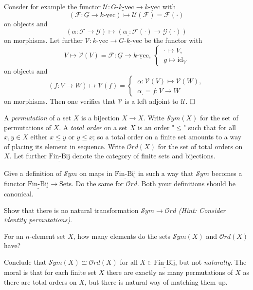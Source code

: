 \documentclass[11pt]{book}
\numberwithin{dummy}{section}
\theoremstyle{nonumberbreak}
\newenvironment{sol}[1][]{\ifthenelse{\equal{#1}{}}{\solution}{\solution[#1]}\rm}{\endsolution}
\newenvironment{prob}[1][]{\ifthenelse{\equal{#1}{}}{\problem}{\problem[#1]}\rm}{\endproblem}
\newcommand{\sets}{\underline{\mathrm{Sets}}}
\newcommand{\kvec}{\underline{k\textrm{-}\mathrm{vec}}}
\newcommand{\finbij}{\underline{\mathrm{Fin}\textrm{-}\mathrm{Bij}}}
\newcommand{\gkvec}{\underline{G\textrm{-}k\textrm{-}\mathrm{vec}}}
\newcommand{\F}{\mathcal{F}}
\newcommand{\G}{\mathcal{G}}
\newcommand{\la}{\longrightarrow}
\newcommand{\id}{\mathrm{id}}
\begin{document}
\begin{spacing}{1.4}
\begin{prob}
\begin{sol}
\begin{compactenum}
\item Consder for example the functor $\mathcal{U}: \gkvec \la \kvec$ with 
$$(\F: \underline{G} \la \kvec) \mapsto \mathcal{U}(\F) = \F(\cdot)$$
on objects and 
$$(\alpha: \F \la \G) \mapsto \left( \alpha_.: \F(\cdot) \la \G(\cdot)\right)$$
on morphisms. Let further $\mathcal{V}: \kvec \la \gkvec$ be the functor with 
$$V \mapsto \mathcal{V}(V) = \F: \underline{G} \la \kvec, \ \begin{cases} \ \cdot \mapsto V, \\ \ g \mapsto \id_V \end{cases}$$
on objects and 
$$(f:V \la W) \mapsto \mathcal{V}(f) = \begin{cases} \ \alpha: \mathcal{V}(V) \mapsto \mathcal{V}(W), \\ \ \alpha_. = f: V \la W \end{cases} $$
on morphisms. Then one verifies that $\mathcal{V}$ is a left adjoint to $\mathcal{U}$. $\hfill \Box$



\end{compactenum}

\end{sol}




\end{prob}


\begin{prob}     %
A \textit{permutation} of a set $X$ is a bijection $X \la X$. Write $\mathcal{S}ym(X)$ for the set of permutations of $X$. A \textit{total order} on a set $X$ is an order "$\leqslant$" such that for all $x,y \in X$ either $x \leqslant y$ or $y \leqslant x$; so a total order on a finite set amounts to a way of placing its element in sequence. Write $\mathcal{O}rd(X)$ for the set of total orders on $X$. Let further $\underline{\mathrm{Fin}\textrm{-}\mathrm{Bij}}$ denote the category of finite sets and bijections.
\begin{compactenum}
\item Give a definition of $\mathcal{S}ym$ on maps in $\finbij$ in such a way that $\mathcal{S}ym$ becomes a functor $\finbij \la \sets$. Do the same for $\mathcal{O}rd$. Both your definitions should be canonical.
\item Show that there is no natural transformation $\mathcal{S}ym \la \mathcal{O}rd$ \textit{(Hint: Consider identity permutations)}.
\item For an $n$-element set $X$, how many elements do the sets $\mathcal{S}ym(X)$ and $\mathcal{O}rd(X)$ have?
\item Conclude that $\mathcal{S}ym(X) \cong \mathcal{O}rd(X)$ for all $X \in \finbij$, but not \textit{naturally}. The moral is that for each finite set $X$ there are exactly as many permutations of $X$ as there are total orders on $X$, but there is natural way of matching them up.
\end{compactenum}


\end{prob}
\end{spacing}
\end{document}
